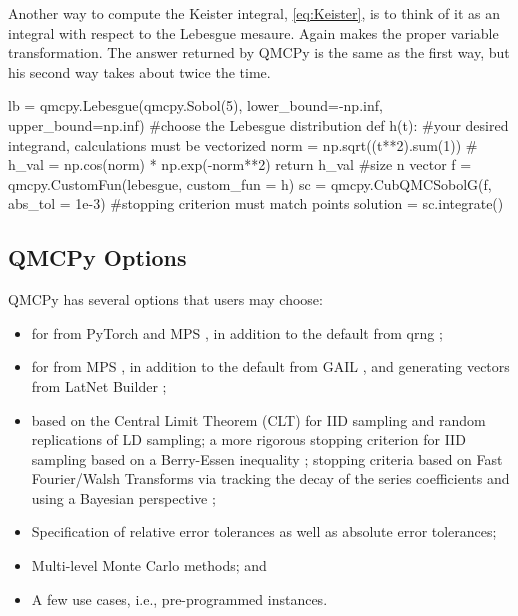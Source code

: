 \documentclass[11pt]{NSFamsart}
\begin{document}
Another way to compute the Keister integral, \eqref{eq:Keister}, is to think of it as an integral with respect to the Lebesgue mesaure.  Again  makes the proper variable transformation.  The answer returned by QMCPy is the same as the first way, but his second way takes about twice the time.

 \begin{pythoncode}
lb = qmcpy.Lebesgue(qmcpy.Sobol(5), lower_bound=-np.inf, upper_bound=np.inf)   #choose the Lebesgue distribution
def h(t):  #your desired integrand, calculations must be vectorized
 	norm = np.sqrt((t**2).sum(1))  #
 	h_val = np.cos(norm) * np.exp(-norm**2)
 	return h_val  #size n vector
 f = qmcpy.CustomFun(lebesgue, custom_fun = h)
 sc = qmcpy.CubQMCSobolG(f, abs_tol = 1e-3)  #stopping criterion must match  points
 solution = sc.integrate()
 \end{pythoncode}
 
 \subsection{QMCPy Options}
 QMCPy has several options that users may choose:
 \begin{itemize}
 	\item {} for  from PyTorch \cite{PyTorch} and MPS \cite{Nuy17a}, in addition to the default from qrng \cite{QRNG2020};
 	
 	\item {} for  from MPS \cite{Nuy17a}, in addition to the default from GAIL \cite{ChoEtal20a}, and generating vectors from LatNet Builder \cite{LatNet};
 	
 	\item {} based on the Central Limit Theorem (CLT) for IID sampling and random replications of LD sampling;  a more rigorous stopping criterion for IID sampling based on a Berry-Essen inequality \cite{HicEtal14a};  stopping criteria based on Fast Fourier/Walsh Transforms via tracking the decay of the series coefficients \cite{HicJim16a, JimHic16a} and using a Bayesian perspective \cite{RatHic19a};
 	
 	\item Specification of relative error tolerances as well as absolute error tolerances;
 	
 	\item Multi-level Monte Carlo methods; and 
 	
 	\item A few use cases, i.e., pre-programmed  instances.
 \end{itemize}
 
\end{document}

